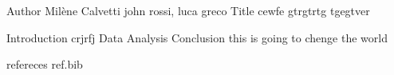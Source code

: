 
Author Milène Calvetti john rossi, luca greco
Title cewfe gtrgtrtg tgegtver

Introduction crjrfj  
Data 
Analysis
Conclusion this is going to chenge the world

refereces 
ref.bib

